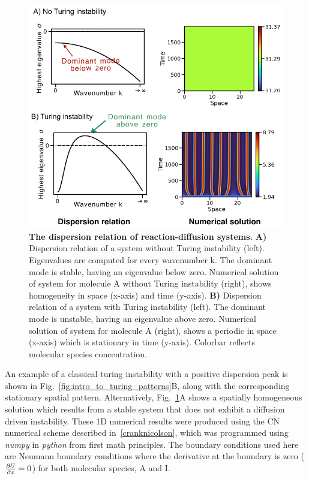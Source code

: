 \begin{figure}[H] %
    \centering
    \includegraphics[width=1\textwidth]{chapters/Chapter 1/turing_vs_noturing} %
    \caption{\textbf{The dispersion relation of reaction-diffusion systems.} \textbf{A)} Dispersion relation of a system without Turing instability (left). Eigenvalues are computed for every wavenumber k. The dominant mode is stable, having an eigenvalue below zero. Numerical solution of system for molecule A without Turing instability (right), shows homogeneity in space (x-axis) and time (y-axis).  \textbf{B)} Dispersion relation of a system with Turing instability (left). The dominant mode is unstable, having an eigenvalue above zero. Numerical solution of system for molecule A (right), shows a periodic in space (x-axis) which is stationary in time (y-axis). Colorbar reflects molecular species concentration.}
    \label{fig:turing_vs_noturing} %
\end{figure}
An example of a classical turing instability with a positive dispersion peak is shown in Fig.~\ref{fig:intro_to_turing_patterns}B, along with the corresponding stationary spatial pattern.
Alternatively, Fig.~\ref{fig:turing_vs_noturing}A shows a spatially homogeneous solution which results from a stable system that does not exhibit a diffusion driven instability.
These 1D numerical results were produced using the \acrfull{CN} numerical scheme described in~\ref{cranknicolson}, which was programmed using \textit{numpy} in \textit{python} from first math principles.
The boundary conditions used here are Neumann boundary conditions where the derivative at the boundary is zero ($\pdv{U}{x}=0$) for both molecular species, A and I.

